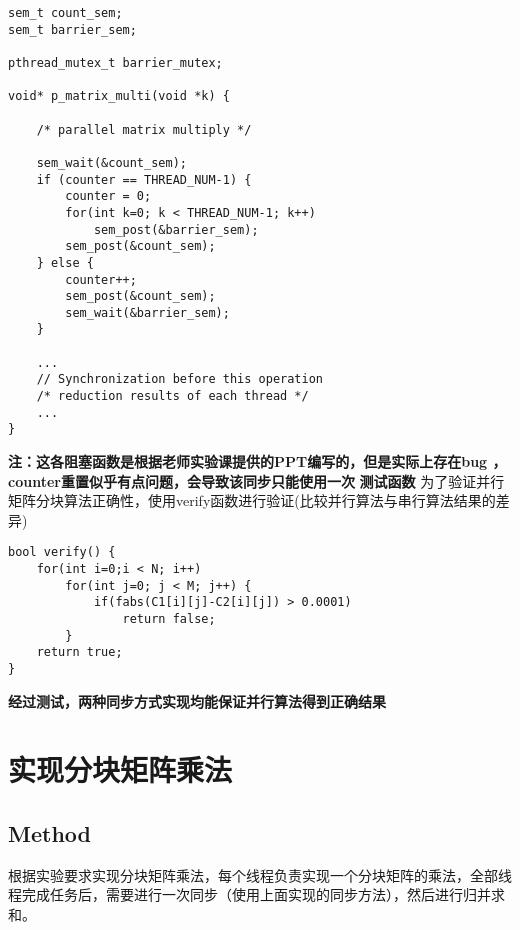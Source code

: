 \documentclass{article}
\begin{document}
\begin{lstlisting}
sem_t count_sem;
sem_t barrier_sem;

pthread_mutex_t barrier_mutex;

void* p_matrix_multi(void *k) {

    /* parallel matrix multiply */

    sem_wait(&count_sem);
    if (counter == THREAD_NUM-1) {
        counter = 0;
        for(int k=0; k < THREAD_NUM-1; k++)
            sem_post(&barrier_sem);
        sem_post(&count_sem);
    } else {
        counter++;
        sem_post(&count_sem);
        sem_wait(&barrier_sem);
    }

    ...
    // Synchronization before this operation
    /* reduction results of each thread */
    ...
}
\end{lstlisting}
\newline
\textbf{注：这各阻塞函数是根据老师实验课提供的PPT编写的，但是实际上存在bug
，counter重置似乎有点问题，会导致该同步只能使用一次}
\newline
\textbf{测试函数}
为了验证并行矩阵分块算法正确性，使用verify函数进行验证(比较并行算法与串行算法结果的差异)
\begin{lstlisting}
bool verify() {
    for(int i=0;i < N; i++)
        for(int j=0; j < M; j++) {
            if(fabs(C1[i][j]-C2[i][j]) > 0.0001)
                return false;
        }
    return true;
} 
\end{lstlisting}

\textbf{经过测试，两种同步方式实现均能保证并行算法得到正确结果}

\section{实现分块矩阵乘法}
\subsection{Method}
根据实验要求实现分块矩阵乘法，每个线程负责实现一个分块矩阵的乘法，全部线程完成任务后，需要进行一次同步（使用上面实现的同步方法），然后进行归并求和。
\end{document}
